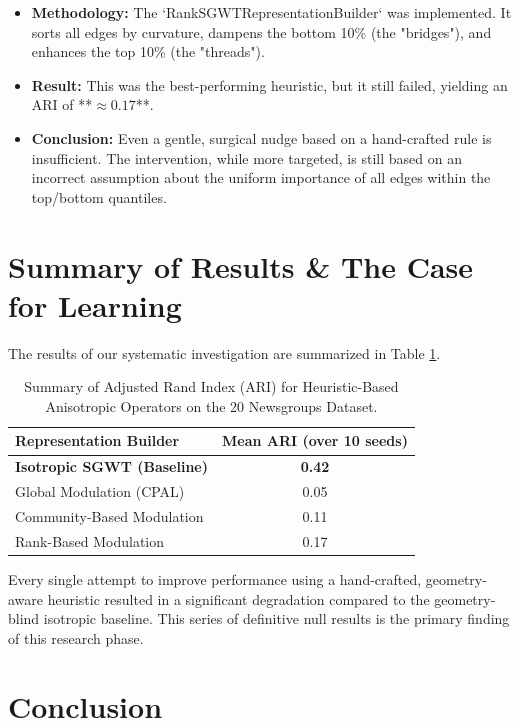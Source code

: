 \documentclass[11pt, a4paper]{article}
\begin{document}
\begin{itemize}
    \item \textbf{Methodology:} The `RankSGWTRepresentationBuilder` was implemented. It sorts all edges by curvature, dampens the bottom 10\% (the "bridges"), and enhances the top 10\% (the "threads").
    \item \textbf{Result:} This was the best-performing heuristic, but it still failed, yielding an ARI of **$\approx 0.17$**.
    \item \textbf{Conclusion:} Even a gentle, surgical nudge based on a hand-crafted rule is insufficient. The intervention, while more targeted, is still based on an incorrect assumption about the uniform importance of all edges within the top/bottom quantiles.
\end{itemize}

\section{Summary of Results \& The Case for Learning}

The results of our systematic investigation are summarized in Table \ref{tab:results}.

\begin{table}[h!]
    \centering
    \caption{Summary of Adjusted Rand Index (ARI) for Heuristic-Based Anisotropic Operators on the 20 Newsgroups Dataset.}
    \label{tab:results}
    \begin{tabular}{@{}lc@{}}
        \toprule
        \textbf{Representation Builder} & \textbf{Mean ARI (over 10 seeds)} \\ \midrule
        \textbf{Isotropic SGWT (Baseline)} & \textbf{0.42} \\ \midrule
        Global Modulation (CPAL) & 0.05 \\
        Community-Based Modulation & 0.11 \\
        Rank-Based Modulation & 0.17 \\ \bottomrule
    \end{tabular}
\end{table}

Every single attempt to improve performance using a hand-crafted, geometry-aware heuristic resulted in a significant degradation compared to the geometry-blind isotropic baseline. This series of definitive null results is the primary finding of this research phase.

\section{Conclusion}
\end{document}
